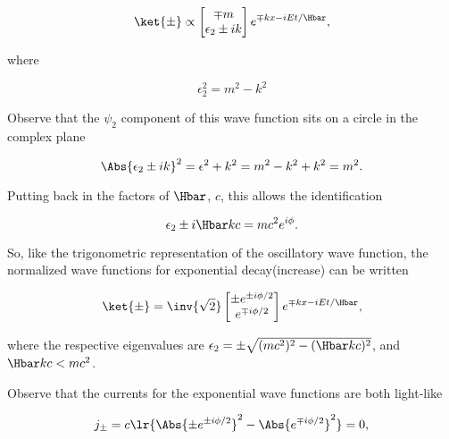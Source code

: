 \begin{enumerate}[(i)]
\begin{dmath}\label{eqn:gradQuantumProblemSet4Problem3:1061}
\ket{\pm} \propto
\begin{bmatrix}
\mp m \\
\epsilon_2 \pm i k
\end{bmatrix}
e^{\mp k x - i E t/\Hbar},
\end{dmath}

where

\begin{dmath}\label{eqn:gradQuantumProblemSet4Problem3:1081}
\epsilon_2^2 = m^2 - k^2
\end{dmath}

Observe that the \( \psi_2 \) component of this wave function sits on a circle in the complex plane

\begin{dmath}\label{eqn:gradQuantumProblemSet4Problem3:1101}
\Abs{\epsilon_2 \pm i k}^2
= \epsilon^2 + k^2
= m^2 - k^2 + k^2
= m^2.
\end{dmath}

Putting back in the factors of \( \Hbar \), \( c\), this allows the identification

\begin{dmath}\label{eqn:gradQuantumProblemSet4Problem3:1121}
\epsilon_2 \pm i \Hbar k c = m c^2 e^{i\phi}.
\end{dmath}

So, like the trigonometric representation of the oscillatory wave function, the normalized wave functions for exponential decay(increase) can be written

\begin{dmath}\label{eqn:gradQuantumProblemSet4Problem3:1141}
\ket{\pm}
=
\inv{\sqrt{2}}
\begin{bmatrix}
\pm e^{\pm i \phi/2} \\
e^{\mp i \phi/2}
\end{bmatrix}
e^{\mp k x - i E t/\Hbar}
,
\end{dmath}

where the respective eigenvalues are \( \epsilon_2 = \pm \sqrt{ (m c^2)^2 - (\Hbar k c)^2} \), and \( \Hbar k c < m c^2 \).

Observe that the currents for the exponential wave functions are both light-like

\begin{equation}\label{eqn:gradQuantumProblemSet4Problem3:1161}
j_{\pm} = c \lr{ \Abs{\pm e^{\pm i \phi/2}}^2 - \Abs{e^{\mp i \phi/2}}^2 } = 0,
\end{equation}


\end{enumerate}
